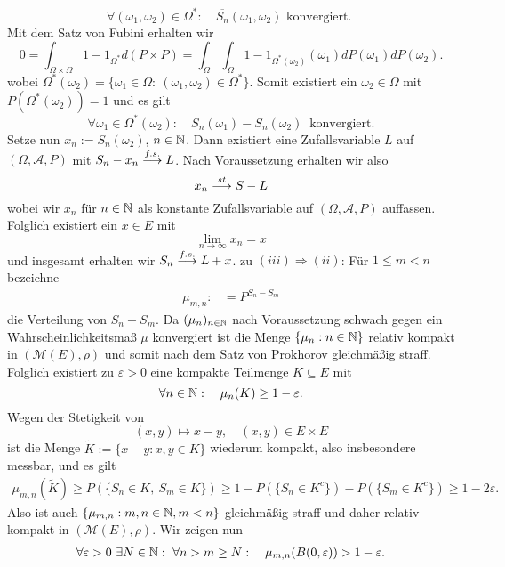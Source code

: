 \begin{proof*}
    $$  
        \forall (\omega_1, \omega_2) \in \Omega^*: \quad \overline{S_n}(\omega_1, \omega_2) \text{ konvergiert. }
    $$
    Mit dem Satz von Fubini erhalten wir
    $$
        0 = \int_{\Omega \times \Omega}1 - 1_{\Omega^*} d(P \times P) = \int_{\Omega}\int_{\Omega}1 - 1_{\Omega^*(\omega_2)}(\omega_1)dP(\omega_1)dP(\omega_2). 
    $$
    wobei $\Omega^*(\omega_2) =\{\omega_1\in\Omega: \ (\omega_1, \omega_2) \in \Omega^* \}$. Somit existiert ein $\omega_2 \in \Omega$ mit $P(\Omega^*(\omega_2)) = 1$ und es gilt
    $$
        \forall \omega_1 \in \Omega^*(\omega_2): \quad S_n(\omega_1) - S_n(\omega_2) \ \text{ konvergiert.}
    $$
    Setze nun $x_n := S_n(\omega_2)$, $n \in \mathbb{N}$. Dann existiert eine Zufallsvariable $L$ auf $(\Omega, \mathcal{A}, P)$ mit $S_n - x_n \overset{f.s.}{\longrightarrow} L$. Nach Voraussetzung erhalten wir also 
    $$
        x_n \overset{st}{\longrightarrow} S - L
    $$
    wobei wir $x_n$ für $n \in \mathbb{N}$ als konstante Zufallsvariable auf $(\Omega, \mathcal{A}, P)$ auffassen. Folglich existiert ein $x \in E$ mit 
    $$
        \lim_{n \to \infty}x_n = x
    $$
    und insgesamt erhalten wir $S_n \overset{f.s.}{\longrightarrow} L + x$. 
    \newline 
    zu $(iii) \Rightarrow (ii)$: Für $1 \leq m < n$ bezeichne
    \begin{align*}
        \mu_{m,n} :&= P^{S_n - S_m}
    \end{align*}
    die Verteilung von $S_n - S_m$. Da $(\mu_n)_{n \in \mathbb{N}}$ nach Voraussetzung schwach gegen ein Wahrscheinlichkeitsmaß $\mu$ konvergiert
    ist die Menge $\{\mu_n: n \in \mathbb{N} \}$ relativ kompakt in $(\mathcal{M}(E), \rho)$ und somit nach dem Satz von Prokhorov gleichmäßig straff.
    Folglich existiert zu $\varepsilon > 0$ eine kompakte Teilmenge $K \subseteq E$ mit 
    $$
        \forall n \in \mathbb{N}: \quad \mu_n(K) \geq 1 - \varepsilon. 
    $$
    Wegen der Stetigkeit von 
    $$
        (x,y) \mapsto x - y, \quad (x,y) \in E \times E
    $$
    ist die Menge $\tilde{K} := \{x - y : x,y \in K \}$ wiederum kompakt, also insbesondere messbar, und es gilt
    \begin{align*}
        \mu_{m,n}(\tilde{K}) \geq P(\{S_n \in K, \ S_m \in K\}) \geq 1 - P(\{S_n \in K^c\}) - P(\{S_m \in K^c\}) \geq 1 - 2\varepsilon.
    \end{align*}
    Also ist auch $\{\mu_{m,n}: m,n \in \mathbb{N}, m < n \}$ gleichmäßig straff und daher relativ kompakt in $(\mathcal{M}(E), \rho)$. 
    Wir zeigen nun
    \begin{align}
        \forall \varepsilon > 0 \ \exists N \in \N: \ \forall n > m \geq N: \quad \mu_{m,n}(B(0,\varepsilon)) > 1 - \varepsilon.

\end{align}
\end{proof*}
